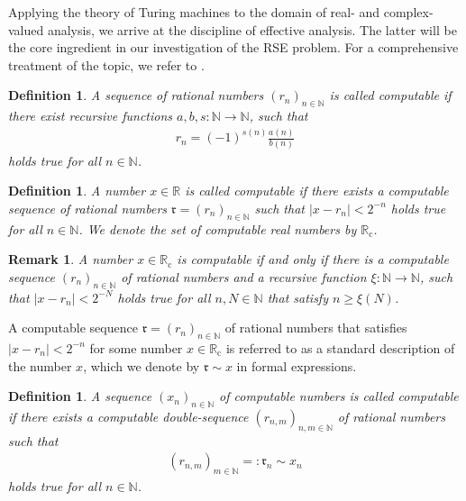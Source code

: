\documentclass[conference]{IEEEtran}
\def\NN{{\mathbb N}}
\def\RR{{\mathbb R}}
\newcommand{\RRc}{\RR_{\mathrm{c}}}
\newtheorem{Definition}[Theorem]{Definition}
\newtheorem{Remark}[Theorem]{Remark}
\begin{document}
	Applying the theory of Turing machines to the domain of real- and complex-valued analysis, we arrive at the 
	discipline of effective analysis. The latter will be the core ingredient in our investigation of the RSE problem. 
	For a comprehensive treatment of the topic, we refer to \cite{PoRi17,AB14}.%

	\begin{Definition}  \label{ber}
						A sequence of rational numbers \((r_n)_{n\in\NN}\) is called computable if there exist recursive functions \(a,b,s:\NN\to\NN\), such that
						\begin{align*}   r_{n} = (-1)^{s(n)}\frac{a(n)}{b(n)} 
						\end{align*} 
						holds true for all \(n\in\NN\).
	\end{Definition}

	\begin{Definition}  \label{compreal}
						A number \(x\in\RR\) is called computable if there exists a computable sequence of rational numbers 
						\(\mathfrak{r} = (r_n)_{n\in\NN}\) such that \(|x-r_n|<2^{-n}\) holds true for all \(n\in\NN\). We denote the set of computable real numbers by \(\RRc\).
	\end{Definition}

	\begin{Remark}  A number \(x\in\RRc\) is computable if and only if there is a computable sequence \((r_n)_{n\in\NN}\) 
					of rational numbers and a recursive function \(\xi:\NN\to\NN\), such that \(|x-r_n|< 2^{-N}\)
					holds true for all \(n,N\in\NN\) that satisfy \(n \geq \xi(N)\). 
	\end{Remark}

	\noindent A computable sequence \(\mathfrak{r} = (r_n)_{n\in\NN}\) of rational numbers that satisfies \(|x-r_n|<2^{-n}\) for some number \(x\in\RRc\) 
	is referred to as a standard description of the number \(x\), which we denote by \(\mathfrak{r}\sim x\) in formal expressions. 
	
	\begin{Definition}	A sequence \((x_n)_{n\in\NN}\) of computable numbers is called computable if there exists a computable double-sequence
						\((r_{n,m})_{n,m\in\NN}\) of rational numbers such that 
						\begin{align} (r_{n,m})_{m\in\NN} =: \mathfrak{r}_n \sim x_n
						\end{align}
						holds true for all \(n\in\NN\).
	\end{Definition}
	
\end{document}
